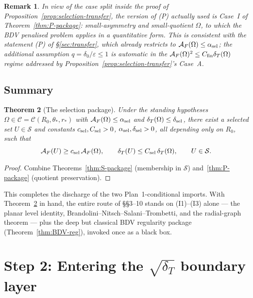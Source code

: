 \documentclass[11pt]{amsart}
\newtheorem{theorem}{Theorem}[section]
\newtheorem{remark}[theorem]{Remark}
\newcommand{\dT}{\delta_T}
\newcommand{\AF}{\mathcal A_F}
\newcommand{\Sclass}{\mathcal S}
\begin{document}
\begin{remark}\label{rem:P-restriction}
In view of the case split inside the proof of
Proposition~\ref{prop:selection-transfer}, the version of (P) actually
used is Case~I of Theorem~\ref{thm:P-package}: small-asymmetry and
small-quotient \(\Omega\), to which the BDV penalised problem applies
in a quantitative form.  This is consistent with the statement (P) of
\S\ref{sec:transfer}, which already restricts to
\(\AF(\Omega)\le\alpha_{\rm sel}\); the additional assumption
\(q=\delta_0/\varepsilon\le 1\) is automatic in the
\(\AF(\Omega)^{2}\le C_{\rm fin}\dT(\Omega)\) regime addressed by
Proposition~\ref{prop:selection-transfer}'s Case~A.
\end{remark}

\subsection{Summary}\label{ss:summary-S11}

\begin{theorem}[The selection package]\label{thm:selection-package}
Under the standing hypotheses
\(\Omega\in\mathcal C=\mathcal C(R_0,\theta_*,r_*)\) with
\(\AF(\Omega)\le\alpha_{\rm sel}\) and
\(\dT(\Omega)\le\delta_{\rm sel}\), there exist a selected set
\(U\in\Sclass\) and constants
\(c_{\rm sel},C_{\rm sel}>0\), \(\alpha_{\rm sel},\delta_{\rm sel}>0\),
all depending only on \(R_0\), such that
\[
   \AF(U)\ge c_{\rm sel}\,\AF(\Omega),
   \qquad
   \dT(U)\le C_{\rm sel}\,\dT(\Omega),
   \qquad
   U\in\Sclass.
\]
\end{theorem}

\begin{proof}
Combine Theorems~\ref{thm:S-package} (membership in \(\Sclass\))
and~\ref{thm:P-package} (quotient preservation).
\end{proof}

This completes the discharge of the two Plan~1-conditional imports.
With Theorem~\ref{thm:selection-package} in hand, the entire route of
\S\S3--10 stands on (I1)--(I3) alone --- the planar level identity,
Brandolini--Nitsch--Salani--Trombetti, and the radial-graph theorem ---
plus the deep but classical BDV regularity package
(Theorem~\ref{thm:BDV-reg}), invoked once as a black box.

\section{Step 2: Entering the $\sqrt{\dT}$ boundary layer}
\label{sec:step2-bdry}
\end{document}
